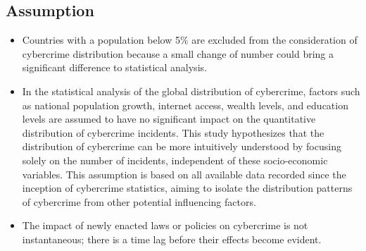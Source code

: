 \subsection{Assumption}\label{subsec:assumption} %
\begin{itemize}
    \item Countries with a population below 5\% are excluded from the consideration of cybercrime distribution because
        a small change of number could bring a significant difference to statistical analysis.
    \item In the statistical analysis of the global distribution of cybercrime,
        factors such as national population growth, internet access, wealth levels, and education levels
        are assumed to have no significant impact on the quantitative distribution of cybercrime incidents.
        This study hypothesizes that the distribution of cybercrime can be more intuitively understood by focusing solely on the number of incidents,
        independent of these socio-economic variables.
        This assumption is based on all available data recorded since the inception of cybercrime statistics,
        aiming to isolate the distribution patterns of cybercrime from other potential influencing factors.
    \item The impact of newly enacted laws or policies on cybercrime is not instantaneous;
        there is a time lag before their effects become evident.
\end{itemize}
